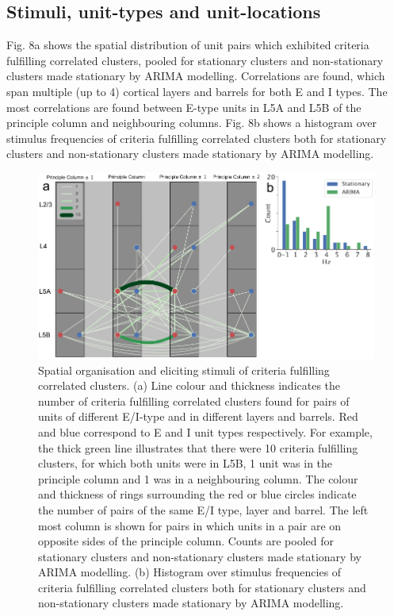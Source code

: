 \documentclass{article}
\begin{document}
\subsection*{Stimuli, unit-types and unit-locations}

Fig. 8a shows the spatial distribution of unit pairs which exhibited criteria fulfilling correlated clusters, pooled for stationary clusters and non-stationary clusters made stationary by ARIMA modelling. Correlations are found, which span multiple (up to 4) cortical layers and barrels for both E and I types. The most correlations are found between E-type units in L5A and L5B of the principle column and neighbouring columns. Fig. 8b shows a histogram over stimulus frequencies of criteria fulfilling correlated clusters both for stationary clusters and non-stationary clusters made stationary by ARIMA modelling. 

\begin{figure}[t!]
\centering
\includegraphics[width=\textwidth]{Figure8.pdf}
\caption{Spatial organisation and eliciting stimuli of criteria fulfilling correlated clusters. (a) Line colour and thickness indicates the number of criteria fulfilling correlated clusters found for pairs of units of different E/I-type and in different layers and barrels. Red and blue correspond to E and I unit types respectively. For example, the thick green line illustrates that there were 10 criteria fulfilling clusters, for which both units were in L5B, 1 unit was in the principle column and 1 was in a neighbouring column. The colour and thickness of rings surrounding the red or blue circles indicate the number of pairs of the same E/I type, layer and barrel. The left most column is shown for pairs in which units in a pair are on opposite sides of the principle column. Counts are pooled for stationary clusters and non-stationary clusters made stationary by ARIMA modelling. (b) Histogram over stimulus frequencies of criteria fulfilling correlated clusters both for stationary clusters and non-stationary clusters made stationary by ARIMA modelling.}
\label{fig:universe}
\end{figure}
\end{document}
